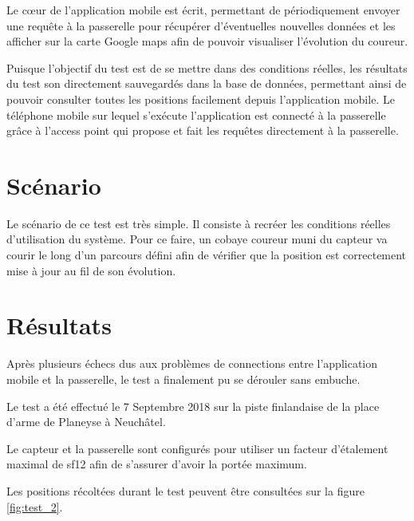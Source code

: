 Le cœur de l'application mobile est écrit, permettant de périodiquement envoyer une requête à la passerelle pour récupérer d'éventuelles nouvelles données et les afficher sur la carte Google maps afin de pouvoir visualiser l'évolution du coureur.

Puisque l'objectif du test est de se mettre dans des conditions réelles, les résultats du test son directement sauvegardés dans la base de données, permettant ainsi de pouvoir consulter toutes les positions facilement depuis l'application mobile. Le téléphone mobile sur lequel s'exécute l'application est connecté à la passerelle grâce à l'access point qui propose et fait les requêtes directement à la passerelle.


\section{Scénario}

Le scénario de ce test est très simple. Il consiste à recréer les conditions réelles d'utilisation du système. Pour ce faire, un cobaye coureur muni du capteur va courir le long d'un parcours défini afin de vérifier que la position est correctement mise à jour au fil de son évolution.

\section{Résultats}

Après plusieurs échecs dus aux problèmes de connections entre l'application mobile et la passerelle, le test a finalement pu se dérouler sans embuche.

Le test a été effectué le 7 Septembre 2018 sur la piste finlandaise de la place d'arme de Planeyse à Neuchâtel.

Le capteur et la passerelle sont configurés pour utiliser un facteur d'étalement maximal de sf12 afin de s'assurer d'avoir la portée maximum.

Les positions récoltées durant le test peuvent être consultées sur la figure \ref{fig:test_2}.

